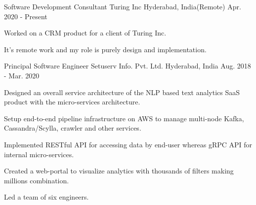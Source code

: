 

\begin{cventries}

  \cventry
    {Software Development Consultant} %
    {Turing Inc} %
    {Hyderabad, India(Remote)} %
    {Apr. 2020 - Present} %
    {
      \begin{cvitems} %
        \item {Worked on a CRM product for a client of Turing Inc.}
        \item {It's remote work and my role is purely design and implementation.}
      \end{cvitems}
    }
  \cventry
    {Principal Software Engineer} %
    {Setuserv Info. Pvt. Ltd.} %
    {Hyderabad, India} %
    {Aug. 2018 - Mar. 2020} %
    {
      \begin{cvitems} %
        \item {Designed an overall service architecture of the NLP based text analytics SaaS product with the micro-services architecture.}
        \item {Setup end-to-end pipeline infrastructure on AWS to manage multi-node Kafka, Cassandra/Scylla, crawler and other services.}
        \item {Implemented RESTful API for accessing data by end-user whereas gRPC API for internal micro-services.} 
        \item {Created a web-portal to visualize analytics with thousands of filters making millions combination.}
        \item {Led a team of six engineers.}
      \end{cvitems}
    }


\end{cventries}
